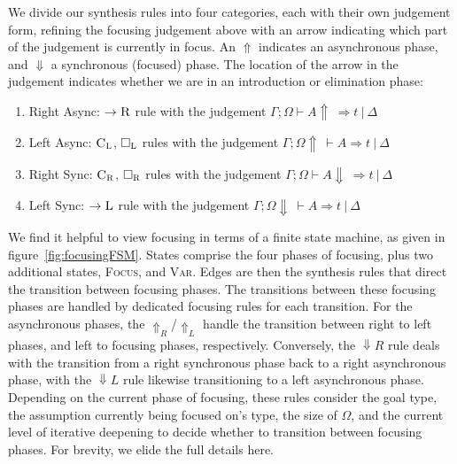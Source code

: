 We divide our synthesis rules into four categories,
each with their own judgement form, refining the focusing judgement above with an
arrow indicating which part of the judgement is currently in focus. An $\Uparrow$
indicates an asynchronous phase, and $\Downarrow$ a synchronous (focused) phase. The
location of the arrow in the judgement indicates whether we are in an introduction or
elimination phase:
\begin{enumerate}
  \item Right Async: $\rightarrow{\textsc{R}}$ rule with the judgement $\Gamma ; \Omega \vdash A \Uparrow\ \Rightarrow t\ |\ \Delta $
        \item Left Async:  $\textsc{C}_{\textsc{L}}$, $\Box_{\textsc{L}}$ rules with the judgement
        $\Gamma ; \Omega \Uparrow\ \vdash A \Rightarrow t\ |\ \Delta $
        \item Right Sync:  $\textsc{C}_{\textsc{R}}$, $\Box_{\textsc{R}}$ rules with the judgement
        $\Gamma ; \Omega \vdash A \Downarrow\ \Rightarrow t\ |\ \Delta $
        \item Left Sync:   $\rightarrow{\textsc{L}}$ rule with the judgement $\Gamma ; \Omega \Downarrow\ \vdash A \Rightarrow t\ |\ \Delta $
\end{enumerate}
We find it helpful to view focusing in terms of a finite state machine, as given in
figure~\ref{fig:focusingFSM}. States comprise the four phases of focusing, plus
two additional states, \textsc{Focus}, and \textsc{Var}. Edges are then the
synthesis rules that direct the transition between focusing phases. The transitions between these focusing phases are handled by dedicated focusing
rules for each transition. For the asynchronous phases, the $\Uparrow_{R}$/$\Uparrow_{L}$ handle the transition between right to left phases,
and left to focusing phases, respectively. Conversely, the $\Downarrow{R}$ rule deals with the transition from a right synchronous phase back to a right asynchronous phase,
with the $\Downarrow{L}$ rule likewise transitioning to a left asynchronous phase. Depending on the current phase of focusing, these
rules consider the goal type, the assumption currently being focused on's type,
the size of $\Omega$, and the current
level of iterative deepening to decide whether to transition between focusing
phases. For brevity, we elide the full details here.


